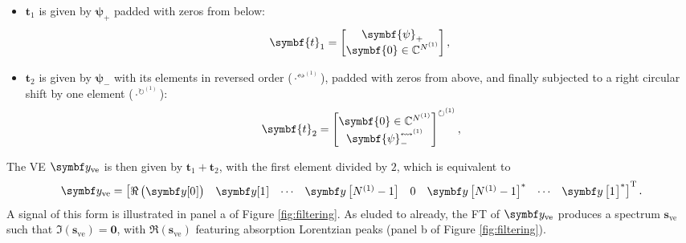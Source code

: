 \begin{itemize}
    \item $\symbf{t}_1$ is given by $\symbf{\psi}_+$ padded with zeros from below:
        \begin{equation}
            \symbf{t}_1 = \begin{bmatrix}
                \symbf{\psi}_+ \\ \symbf{0} \in \mathbb{C}^{\None}
            \end{bmatrix},\\
        \end{equation}
    \item $\symbf{t}_2$ is given by $\symbf{\psi}_{-}$ with its elements in
        reversed order ($\cdot^{{\leftrightsquigarrow}^{(1)}}$), padded with zeros
        from above, and finally subjected to a right circular shift by one
        element ($\cdot^{{\circlearrowright}^{(1)}}$):
        \begin{equation}
            \symbf{t}_2 = \begin{bmatrix}
                \symbf{0} \in \mathbb{C}^{\None} \\ \symbf{\psi}_-^{{\leftrightsquigarrow}^{(1)}}
        \end{bmatrix}^{{\circlearrowright}^{(1)}},
       \end{equation}
\end{itemize}
The \ac{VE} $\by_{\text{ve}}$ is then given by $\symbf{t}_1 +
\symbf{t}_2$, with the first element divided by $2$, which is equivalent to
\begin{equation}
    \by_{\text{ve}} =
    \begin{bmatrix}
        \Re\left( \by[0^{\vphantom{(1)}}] \right) &
        \by[1^{\vphantom{(1)}}] &
        \cdots &
        \by\left[\None - 1\right] &
        0 &
        \by\left[\None - 1\right]^* &
        \cdots &
        \by\left[1^{\vphantom{(1)}}\right]^*
    \end{bmatrix}\T.
\end{equation}
A signal of this form is illustrated in panel a of Figure \ref{fig:filtering}. As
eluded to already, the \ac{FT} of $\by_{\text{ve}}$ produces a spectrum
$\symbf{s}_{\text{ve}}$ such that $\Im\left(\symbf{s}_{\text{ve}}\right) =
\symbf{0}$, with $\Re\left(\symbf{s}_{\text{ve}}\right)$ featuring absorption
Lorentzian peaks (panel b of Figure \ref{fig:filtering}).


